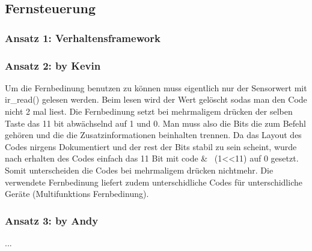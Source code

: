\subsection{Fernsteuerung}
\label{fernsteuerung}

\subsubsection{Ansatz 1: Verhaltensframework}

\subsubsection{Ansatz 2: by Kevin}

Um die Fernbedinung benutzen zu können muss eigentlich nur der Sensorwert mit ir_read() gelesen werden. Beim lesen wird der Wert gelöscht sodas man den Code nicht 2 mal liest. Die Fernbedinung setzt bei mehrmaligem drücken der selben Taste das 11 bit abwächselnd auf 1 und 0. Man muss also die Bits die zum Befehl gehören und die die Zusatzinformationen beinhalten trennen. Da das Layout des Codes nirgens Dokumentiert und der rest der Bits stabil zu sein scheint, wurde nach erhalten des Codes einfach das 11 Bit mit code & ~(1<<11) auf 0 gesetzt. Somit unterscheiden die Codes bei mehrmaligem drücken nichtmehr. Die verwendete Fernbedinung liefert zudem unterschidliche Codes für unterschidliche Geräte (Multifunktions Fernbedinung).

\subsubsection{Ansatz 3: by Andy}
...
